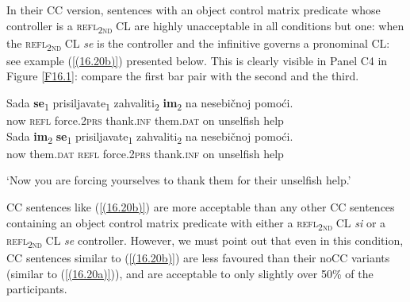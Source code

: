 \noindent In their CC version, sentences with an object control matrix predicate whose controller is a \textsc{refl\textsubscript{2nd}} CL are highly unacceptable in all conditions but one: when the \textsc{refl\textsubscript{2nd}} CL \textit{se} is the controller and the infinitive governs a pronominal CL: see example (\ref{(16.20b)}) presented below. This is clearly visible in Panel C4 in Figure \ref{F16.1}: compare the first bar pair with the second and the third.

\begin{exe}\ex\begin{xlist}
\ex\label{(16.20a)}
\gll Sada \textbf{se}\textsubscript{1} prisiljavate\textsubscript{1} zahvaliti\textsubscript{2} \textbf{im}\textsubscript{2} na nesebičnoj pomoći.\\
 now \textsc{refl} force.2\textsc{prs} thank.\textsc{inf} them.\textsc{dat} on unselfish help \\
\ex\label{(16.20b)}
\gll Sada \textbf{im}\textsubscript{2} \textbf{se}\textsubscript{1} prisiljavate\textsubscript{1} zahvaliti\textsubscript{2} na nesebičnoj pomoći. \\
 now them.\textsc{dat} \textsc{refl} force.2\textsc{prs} thank.\textsc{inf} on unselfish help \\
\end{xlist}
\glt ‘Now you are forcing yourselves to thank them for their unselfish help.’
\end{exe}

\largerpage[2]%
\noindent CC sentences like (\ref{(16.20b)}) are more acceptable than any other CC sentences containing an object control matrix predicate with either a \textsc{refl\textsubscript{2nd}} CL \textit{si} or a \textsc{refl\textsubscript{2nd}} CL \textit{se} controller. However, we must point out that even in this condition, CC sentences similar to (\ref{(16.20b)}) are less favoured than their noCC variants (similar to (\ref{(16.20a)})), and are acceptable to only slightly over 50\% of the participants. 


